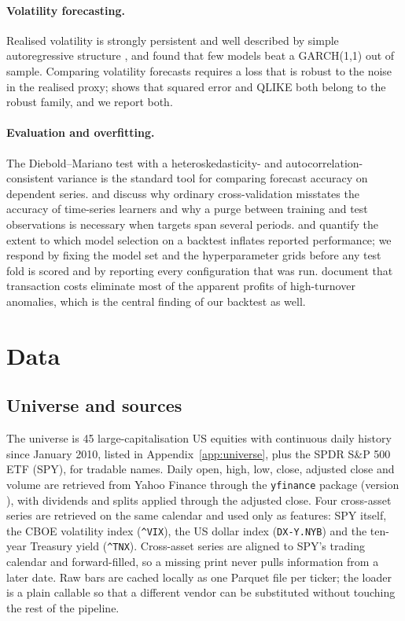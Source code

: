 \documentclass[10pt,a4paper,twoside,twocolumn]{article}
\begin{document}
\paragraph{Volatility forecasting.} Realised volatility is strongly persistent and well described by simple autoregressive structure \citep{andersen2003modeling,corsi2009simple}, and \citet{hansen2005forecast} found that few models beat a GARCH(1,1) out of sample. Comparing volatility forecasts requires a loss that is robust to the noise in the realised proxy; \citet{patton2011volatility} shows that squared error and QLIKE both belong to the robust family, and we report both.

\paragraph{Evaluation and overfitting.} The Diebold--Mariano test \citep{diebold1995comparing} with a heteroskedasticity- and autocorrelation-consistent variance \citep{newey1987simple} is the standard tool for comparing forecast accuracy on dependent series. \citet{bergmeir2012use} and \citet{lopezdeprado2018advances} discuss why ordinary cross-validation misstates the accuracy of time-series learners and why a purge between training and test observations is necessary when targets span several periods. \citet{bailey2014pseudo} and \citet{harvey2016cross} quantify the extent to which model selection on a backtest inflates reported performance; we respond by fixing the model set and the hyperparameter grids before any test fold is scored and by reporting every configuration that was run. \citet{novymarx2016taxonomy} document that transaction costs eliminate most of the apparent profits of high-turnover anomalies, which is the central finding of our backtest as well.

\section{Data}\label{sec:data}

\subsection{Universe and sources}

The universe is 45 large-capitalisation US equities with continuous daily history since January 2010, listed in Appendix~\ref{app:universe}, plus the SPDR S\&P 500 ETF (SPY), for \metantickers{} tradable names. Daily open, high, low, close, adjusted close and volume are retrieved from Yahoo Finance through the \texttt{yfinance} package (version \metavyfinance), with dividends and splits applied through the adjusted close. Four cross-asset series are retrieved on the same calendar and used only as features: SPY itself, the CBOE volatility index (\texttt{\^{}VIX}), the US dollar index (\texttt{DX-Y.NYB}) and the ten-year Treasury yield (\texttt{\^{}TNX}). Cross-asset series are aligned to SPY's trading calendar and forward-filled, so a missing print never pulls information from a later date. Raw bars are cached locally as one Parquet file per ticker; the loader is a plain callable so that a different vendor can be substituted without touching the rest of the pipeline.
\end{document}
